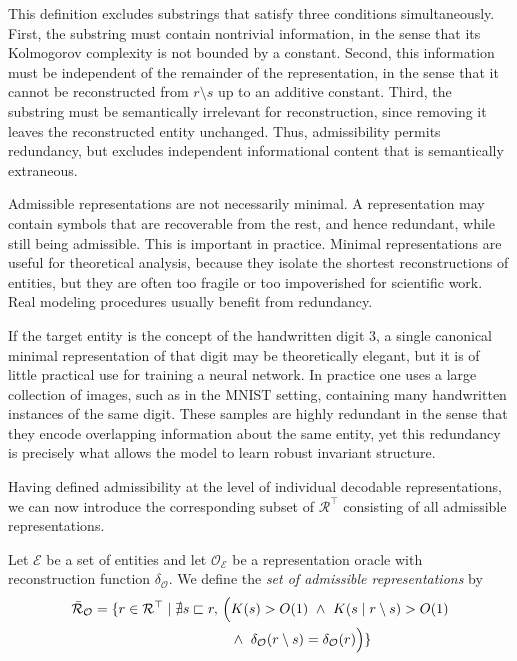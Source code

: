 This definition excludes substrings that satisfy three conditions simultaneously. First, the substring must contain nontrivial information, in the sense that its Kolmogorov complexity is not bounded by a constant. Second, this information must be independent of the remainder of the representation, in the sense that it cannot be reconstructed from $r\setminus s$ up to an additive constant. Third, the substring must be semantically irrelevant for reconstruction, since removing it leaves the reconstructed entity unchanged. Thus, admissibility permits redundancy, but excludes independent informational content that is semantically extraneous.

Admissible representations are not necessarily minimal. A representation may contain symbols that are recoverable from the rest, and hence redundant, while still being admissible. This is important in practice. Minimal representations are useful for theoretical analysis, because they isolate the shortest reconstructions of entities, but they are often too fragile or too impoverished for scientific work. Real modeling procedures usually benefit from redundancy.

\begin{example}
If the target entity is the concept of the handwritten digit $3$, a single canonical minimal representation of that digit may be theoretically elegant, but it is of little practical use for training a neural network. In practice one uses a large collection of images, such as in the MNIST setting, containing many handwritten instances of the same digit. These samples are highly redundant in the sense that they encode overlapping information about the same entity, yet this redundancy is precisely what allows the model to learn robust invariant structure.
\end{example}

Having defined admissibility at the level of individual decodable representations, we can now introduce the corresponding subset of $\mathcal{R}^{\top}$ consisting of all admissible representations.

\begin{definition}
Let $\mathcal{E}$ be a set of entities and let $\mathcal{O}_{\mathcal{E}}$ be a representation oracle with reconstruction function $\delta_{\mathcal O}$. We define the \emph{set of admissible representations} by
\[
\bar{\mathcal{R}}_{\mathcal O} = \{
r\in\mathcal{R}^{\top} \; | \;
\nexists s\sqsubset r,\,
\begin{aligned}[t] \Bigl(
& K(s)>O(1)\ \land\ K(s\mid r\setminus s)>O(1) \\
& \land\ \delta_{\mathcal O}(r\setminus s)=\delta_{\mathcal O}(r) \Bigr)
\}
\end{aligned}
\]
\end{definition}


